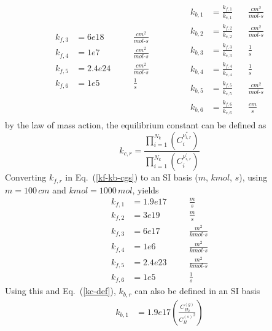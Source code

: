 \documentclass[a4paper]{report}
\newcommand{\eref}[1]{Eq.~(\ref{#1})}
\newcommand{\kf}[1]{k_{f,#1}}
\newcommand{\kb}[1]{k_{b,#1}}
\newcommand{\kcf}[1]{\frac{k_{f,#1}}{k_{c,#1}}}
\newcommand{\cg}[1]{{C_{#1}^{(g)}}}
\newcommand{\cs}[1]{{C_{#1}^{(s)}}}
\begin{document}
\begin{enumerate}
\begin{align}
\begin{alignedat}{2}
      \kf{3} &= 6e18   && \quad \frac{cm^2}{mol\text{-}s} \\
      \kf{4} &= 1e7    && \quad \frac{cm^2}{mol\text{-}s} \\
      \kf{5} &= 2.4e24 && \quad \frac{cm^2}{mol\text{-}s} \\
      \kf{6} &= 1e5    && \quad \frac{1}{s}
    \end{alignedat} \qquad\qquad
    \begin{alignedat}{2}
      \kb{1} &= \kcf{1} \, && \frac{cm^2}{mol\text{-}s} \\
      \kb{2} &= \kcf{2} \, && \frac{cm^2}{mol\text{-}s} \\
      \kb{3} &= \kcf{3} \, && \frac{1}{s} \\
      \kb{4} &= \kcf{4} \, && \frac{1}{s} \\
      \kb{5} &= \kcf{5} \, && \frac{cm^2}{mol\text{-}s} \\
      \kb{6} &= \kcf{6} \, && \frac{cm}{s}
    \end{alignedat}
    \label{kf-kb-cgs}
  \end{align}
  by the law of mass action, the equilibrium constant can be defined as
  \begin{equation}
    k_{c,r} = \frac{\prod_{i=1}^{N_k}(C_i^{\nu_{i,r}^{''}})}
    {\prod_{i=1}^{N_k}(C_i^{\nu_{i,r}^{'}})}
    \label{kc-def}
  \end{equation}
  Converting $\kf{r}$ in \eref{kf-kb-cgs} to an SI basis ($m$, $kmol$, $s$),
  using $m = 100\, cm$ and $kmol = 1000\, mol$, yields
  \begin{equation}
    \boxed{\begin{alignedat}{2}
      \kf{1} &= 1.9e17 && \quad \frac{m}{s} \\
      \kf{2} &= 3e19   && \quad \frac{m}{s} \\
      \kf{3} &= 6e17   && \quad \frac{m^2}{kmol\text{-}s} \\
      \kf{4} &= 1e6    && \quad \frac{m^2}{kmol\text{-}s} \\
      \kf{5} &= 2.4e23 && \quad \frac{m^2}{kmol\text{-}s} \\
      \kf{6} &= 1e5    && \quad \frac{1}{s}
    \end{alignedat}}
  \end{equation}
  Using this and \eref{kc-def}, $\kb{r}$ can also be defined in an SI basis
  \begin{equation}
    \boxed{\begin{alignedat}{2}
      \kb{1} &= 1.9e17 \left(\frac{\cg{H_2}}{\cs{H}^2}\right) 

\end{alignedat}}
\end{equation}
\end{enumerate}
\end{document}
